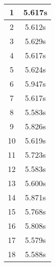 \documentclass[11pt]{article}
\begin{document}
\begin{table}[!h]
\begin{center}
\begin{minipage}{0.48\textwidth}
\begin{tabular}{| c | c |}
				1 & 5.617s \\ \hline
				2 & 5.612s \\ \hline
				3 & 5.629s \\ \hline
				4 & 5.617s \\ \hline
				5 & 5.624s \\ \hline
				6 & 5.947s \\ \hline
				7 & 5.617s \\ \hline
				8 & 5.583s \\ \hline
				9 & 5.826s \\ \hline
				10 & 5.619s \\ \hline
				11 & 5.723s \\ \hline
				12 & 5.583s \\ \hline
				13 & 5.600s \\ \hline
				14 & 5.871s \\ \hline
				15 & 5.768s \\ \hline
				16 & 5.808s \\ \hline
				17 & 5.579s \\ \hline
				18 & 5.588s \\ \hline
			\end{tabular}
		\end{minipage}
	\end{center}
\end{table}

\pagebreak
\end{document}
